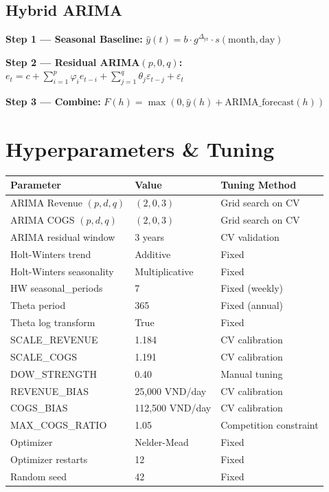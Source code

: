 \documentclass[12pt,a4paper]{article}
\begin{document}
\subsection{Hybrid ARIMA}

\textbf{Step 1 --- Seasonal Baseline:} $\hat{y}(t) = b \cdot g^{\Delta_{\text{yr}}} \cdot s(\text{month}, \text{day})$

\textbf{Step 2 --- Residual ARIMA$(p,0,q)$:} $e_t = c + \sum_{i=1}^{p} \varphi_i e_{t-i} + \sum_{j=1}^{q} \theta_j \varepsilon_{t-j} + \varepsilon_t$

\textbf{Step 3 --- Combine:} $F(h) = \max(0, \hat{y}(h) + \text{ARIMA\_forecast}(h))$

\section{Hyperparameters \& Tuning}

\begin{table}[h!]
\centering
\small
\begin{tabular}{lll}
\toprule
\textbf{Parameter} & \textbf{Value} & \textbf{Tuning Method} \\
\midrule
ARIMA Revenue $(p,d,q)$ & $(2,0,3)$ & Grid search on CV \\
ARIMA COGS $(p,d,q)$ & $(2,0,3)$ & Grid search on CV \\
ARIMA residual window & 3 years & CV validation \\
Holt-Winters trend & Additive & Fixed \\
Holt-Winters seasonality & Multiplicative & Fixed \\
HW seasonal\_periods & 7 & Fixed (weekly) \\
Theta period & 365 & Fixed (annual) \\
Theta log transform & True & Fixed \\
SCALE\_REVENUE & 1.184 & CV calibration \\
SCALE\_COGS & 1.191 & CV calibration \\
DOW\_STRENGTH & 0.40 & Manual tuning \\
REVENUE\_BIAS & 25,000 VND/day & CV calibration \\
COGS\_BIAS & 112,500 VND/day & CV calibration \\
MAX\_COGS\_RATIO & 1.05 & Competition constraint \\
Optimizer & Nelder-Mead & Fixed \\
Optimizer restarts & 12 & Fixed \\
Random seed & 42 & Fixed \\
\bottomrule
\end{tabular}
\end{table}
\end{document}
